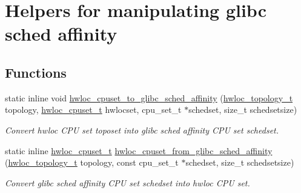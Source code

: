 \hypertarget{group__hwlocality__glibc__sched}{
\section{Helpers for manipulating glibc sched affinity}
\label{group__hwlocality__glibc__sched}
}
\subsection*{Functions}
\begin{DoxyCompactItemize}
\item 
static inline void \hyperlink{group__hwlocality__glibc__sched_ga8d52ded42a9b3d832672d642798cdd8a}{hwloc\_\-cpuset\_\-to\_\-glibc\_\-sched\_\-affinity} (\hyperlink{group__hwlocality__topology_ga9d1e76ee15a7dee158b786c30b6a6e38}{hwloc\_\-topology\_\-t} topology, \hyperlink{group__hwlocality__cpuset_ga7366332f7090f5b54d4b25a0c2c4b411}{hwloc\_\-cpuset\_\-t} hwlocset, cpu\_\-set\_\-t $\ast$schedset, size\_\-t schedsetsize)
\begin{DoxyCompactList}\small\item\em Convert hwloc CPU set {\ttfamily toposet} into glibc sched affinity CPU set {\ttfamily schedset}. \item\end{DoxyCompactList}\item 
static inline \hyperlink{group__hwlocality__cpuset_ga7366332f7090f5b54d4b25a0c2c4b411}{hwloc\_\-cpuset\_\-t} \hyperlink{group__hwlocality__glibc__sched_ga95a1b94fc109895ee13b17bddac08f5f}{hwloc\_\-cpuset\_\-from\_\-glibc\_\-sched\_\-affinity} (\hyperlink{group__hwlocality__topology_ga9d1e76ee15a7dee158b786c30b6a6e38}{hwloc\_\-topology\_\-t} topology, const cpu\_\-set\_\-t $\ast$schedset, size\_\-t schedsetsize)
\begin{DoxyCompactList}\small\item\em Convert glibc sched affinity CPU set {\ttfamily schedset} into hwloc CPU set. \item\end{DoxyCompactList}\end{DoxyCompactItemize}


